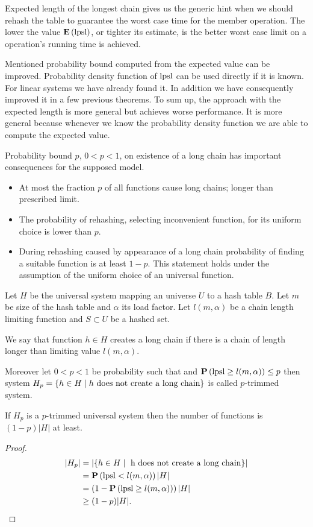 Expected length of the longest chain gives us the generic hint when we should rehash the table to guarantee the worst case time for the member operation. The lower the value $\mathbf{E}\left(\mathrm{lpsl}\right)$, or tighter its estimate, is the better worst case limit on a operation's running time is achieved.

Mentioned probability bound computed from the expected value can be improved. Probability density function of $\mathrm{lpsl}$ can be used directly if it is known. For linear systems we have already found it. In addition we have consequently improved it in a few previous theorems. To sum up, the approach with the expected length is more general but achieves worse performance. It is more general because whenever we know the probability density function we are able to compute the expected value.

Probability bound $p$, $0 < p < 1$, on existence of a long chain has important consequences for the supposed model.
\begin{itemize}
\item At most the fraction $p$ of all functions cause long chains; longer than prescribed limit. 
\item The probability of rehashing, selecting inconvenient function, for its uniform choice is lower than $p$.
\item During rehashing caused by appearance of a long chain probability of finding a suitable function is at least $1 - p$. This statement holds under the assumption of the uniform choice of an universal function.
\end{itemize}

\begin{definition}
Let $H$ be the universal system mapping an universe $U$ to a hash table $B$. Let $m$ be size of the hash table and $\alpha$ its load factor. Let $l(m, \alpha)$ be a chain length limiting function and $S \subset U$ be a hashed set. 

We say that function $h \in H$ creates a long chain if there is a chain of length longer than limiting value $l(m, \alpha)$.

Moreover let $0 < p < 1$ be probability such that and $\mathbf{P}\left(\mathrm{lpsl} \geq l(m, \alpha)\right) \leq p$ then system $H_p = \{ h \in H \mid h \text{ does not create a long chain} \}$ is called $p$-trimmed system.
\end{definition}

\begin{lemma}
\label{lemma-size-of-trimmed-system}
If $H_p$ is a $p$-trimmed universal system then the number of functions is $(1 - p)|H|$ at least.
\end{lemma}
\begin{proof}
\[
\begin{split}
|H_p|
	& = |\lbrace h \in H \mid \text{ h does not create a long chain} \rbrace| \\
	& =\mathbf{P}\left(\mathrm{lpsl} < l(m, \alpha)\right) |H| \\
	& = \left(1 - \mathbf{P}\left(\mathrm{lpsl} \geq l(m, \alpha)\right)\right) |H| \\
	& \geq (1 - p)|H| \text{.}
\end{split}
\]
\end{proof}

